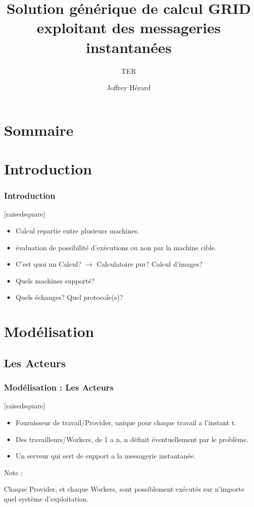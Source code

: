 \documentclass[slidetop,11pt]{beamer}
\title{Solution générique de calcul GRID exploitant des messageries instantanées}
\subtitle{TER}
\author{Joffrey Hérard}
\date{\oldstylenums{28 Mars 2017}}
\begin{document}

\frame{\titlepage}
%
\section*{Sommaire}
%

\section[Introduction]{Introduction}
\begin{frame}[label=debut]
\frametitle{Introduction}
[raisedsquare]
\begin{itemize}
\item Calcul repartie entre plusieurs machines.
\item évaluation de possibilité d'exécutions ou non par la machine cible.
\item C'est quoi un Calcul? $\rightarrow$ Calculatoire pur? Calcul d'images?
\item Quels machines supporté? 
\item Quels échanges? Quel protocole(s)?
\end{itemize}
\end{frame}

\section[Modélisation]{Modélisation}
\subsection[Les Acteurs]{Les Acteurs}
\begin{frame}[label=acteurs,fragile]
\frametitle{Modélisation : Les Acteurs}

[raisedsquare]
\begin{itemize}
\item Fournisseur de travail/Provider, unique pour chaque travail a l'instant t.
\item Des travailleurs/Workers, de 1 a n, n définit éventuellement par le problème.
\item Un serveur qui sert de support a la messagerie instantanée.	

\end{itemize}

\begin{exampleblock}{Note :}
 
Chaque Provider, et chaque Workers, sont possiblement exécutés sur n'importe quel système d'exploitation. 
 \end{exampleblock}
\end{frame}
\end{document}
